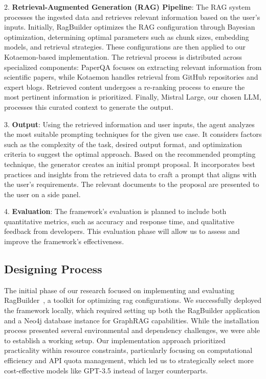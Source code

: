 \documentclass[12pt,twoside,english]{article}
\begin{document}
2. \textbf{Retrieval-Augmented Generation (RAG) Pipeline}: The RAG system processes the ingested data and retrieves relevant information based on the user's inputs. Initially, RagBuilder optimizes the RAG configuration through Bayesian optimization, determining optimal parameters such as chunk sizes, embedding models, and retrieval strategies. These configurations are then applied to our Kotaemon-based implementation. The retrieval process is distributed across specialized components: PaperQA focuses on extracting relevant information from scientific papers, while Kotaemon handles retrieval from GitHub repositories and expert blogs. Retrieved content undergoes a re-ranking process to ensure the most pertinent information is prioritized. Finally, Mistral Large, our chosen LLM, processes this curated context to generate the output.

3. \textbf{Output}: Using the retrieved information and user inputs, the agent analyzes the most suitable prompting techniques for the given use case. It considers factors such as the complexity of the task, desired output format, and optimization criteria to suggest the optimal approach. Based on the recommended prompting technique, the generator creates an initial prompt proposal. It incorporates best practices and insights from the retrieved data to craft a prompt that aligns with the user's requirements. The relevant documents to the proposal are presented to the user on a side panel.

4. \textbf{Evaluation}: The framework's evaluation is planned to include both quantitative metrics, such as accuracy and response time, and qualitative feedback from developers. This evaluation phase will allow us to assess and improve the framework's effectiveness.

\subsection{Designing Process}
The initial phase of our research focused on implementing and evaluating RagBuilder~\cite{KruxAI2024RagBuilder}, a toolkit for optimizing \gls{rag} configurations. We successfully deployed the framework locally, which required setting up both the RagBuilder application and a Neo4j database instance for GraphRAG capabilities. While the installation process presented several environmental and dependency challenges, we were able to establish a working setup. Our implementation approach prioritized practicality within resource constraints, particularly focusing on computational efficiency and API quota management, which led us to strategically select more cost-effective models like GPT-3.5 instead of larger counterparts.
\end{document}
